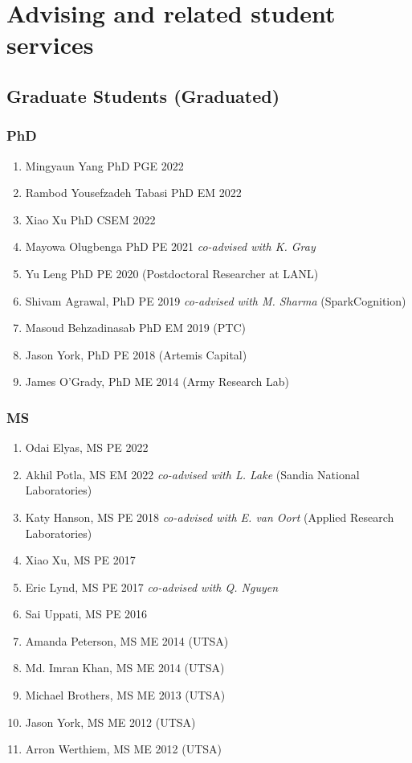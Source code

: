 \section*{Advising and related student services}

\subsection*{Graduate Students (Graduated)}

\subsubsection*{PhD}
\begin{enumerate}
    \item Mingyaun Yang PhD PGE 2022
    \item Rambod Yousefzadeh Tabasi PhD EM 2022
    \item Xiao Xu PhD CSEM 2022
    \item Mayowa Olugbenga PhD PE 2021 \emph{co-advised with K. Gray} 
    \item Yu Leng PhD PE 2020 (Postdoctoral Researcher at LANL)
    \item Shivam Agrawal, PhD PE 2019 \emph{co-advised with M. Sharma} (SparkCognition)
    \item Masoud Behzadinasab PhD EM 2019 (PTC)
    \item Jason York, PhD PE 2018 (Artemis Capital) 
    \item James O'Grady, PhD ME 2014 (Army Research Lab)
\end{enumerate}

\subsubsection*{MS}
\begin{enumerate}
    \item Odai Elyas, MS PE 2022
    \item Akhil Potla, MS EM 2022 \emph{co-advised with L. Lake} (Sandia National Laboratories)
    \item Katy Hanson, MS PE 2018 \emph{co-advised with E. van Oort} (Applied Research Laboratories)
    \item Xiao Xu, MS PE 2017
    \item Eric Lynd, MS PE 2017  \emph{co-advised with Q. Nguyen}
    \item Sai Uppati, MS PE 2016
    \item Amanda Peterson, MS ME 2014 (UTSA)
    \item Md. Imran Khan, MS ME 2014 (UTSA)
    \item Michael Brothers, MS ME 2013 (UTSA)
    \item Jason York, MS ME 2012 (UTSA)
    \item Arron Werthiem, MS ME 2012 (UTSA)
\end{enumerate}

